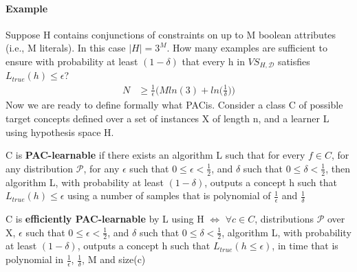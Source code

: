 \documentclass[../main.tex]{subfiles}
\begin{document}
\paragraph{Example} Suppose H contains conjunctions of constraints on up to M boolean attributes (i.e., M literals). In this case $|H|=3^M$. How many examples are sufficient to ensure with probability at least $(1-\delta)$ that every h in $VS_{H,\mathcal{D}}$ satisfies $L_{true}(h) \leq \epsilon$?
\begin{align*}
    N & \geq \frac{1}{\epsilon} \bigg( Mln(3) + ln \bigg( \frac{1}{\delta} \bigg) \bigg)
\end{align*}
\newline
Now we are ready to define formally what PAC\footnotemark is. Consider a class C of possible target concepts defined over a set of instances X of length n, and a learner L using hypothesis space H. 
\begin{definition}
    C is \textbf{PAC-learnable} if there exists an algorithm L such that for every $f \in C$, for any distribution $\mathcal{P}$, for any $\epsilon$ such that $0 \leq \epsilon < \frac{1}{2}$, and $\delta$ such that $0 \leq \delta < \frac{1}{2}$, then algorithm L, with probability at least $(1-\delta)$, outputs a concept h such that $L_{true}(h) \leq \epsilon$ using a number of samples that is polynomial of $\frac{1}{\epsilon}$ and $\frac{1}{\delta}$
\end{definition}
\begin{definition}
    C is \textbf{efficiently PAC-learnable} by L using H $\iff$ $\forall c \in C$, distributions $\mathcal{P}$ over X, $\epsilon$ such that $0 \leq \epsilon < \frac{1}{2}$, and $\delta$ such that $0 \leq \delta < \frac{1}{2}$, algorithm L, with probability at least $(1-\delta)$, outputs a concept h such that $L_{true}(h \leq \epsilon)$, in time that is polynomial in $\frac{1}{\epsilon}$, $\frac{1}{\delta}$, M and size(c)\footnotemark
\end{definition} 
\end{document}
